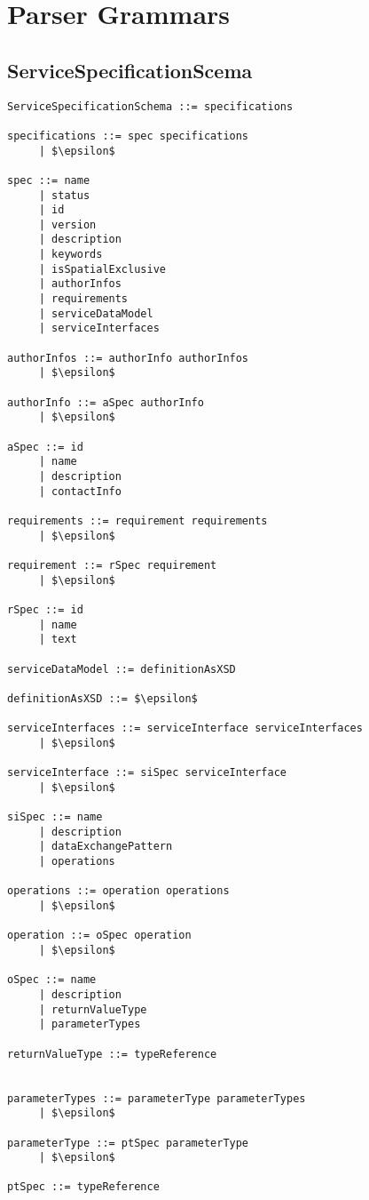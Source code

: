 \section{Parser Grammars}

\subsection{ServiceSpecificationScema}
\begin{lstlisting}[mathescape=true, keywordstyle={}]
ServiceSpecificationSchema ::= specifications

specifications ::= spec specifications
     | $\epsilon$
     
spec ::= name
     | status
     | id
     | version
     | description
     | keywords
     | isSpatialExclusive
     | authorInfos
     | requirements
     | serviceDataModel
     | serviceInterfaces
     
authorInfos ::= authorInfo authorInfos
     | $\epsilon$

authorInfo ::= aSpec authorInfo
     | $\epsilon$

aSpec ::= id
     | name
     | description
     | contactInfo

requirements ::= requirement requirements
     | $\epsilon$

requirement ::= rSpec requirement
     | $\epsilon$

rSpec ::= id
     | name
     | text

serviceDataModel ::= definitionAsXSD

definitionAsXSD ::= $\epsilon$

serviceInterfaces ::= serviceInterface serviceInterfaces
     | $\epsilon$

serviceInterface ::= siSpec serviceInterface
     | $\epsilon$

siSpec ::= name
     | description
     | dataExchangePattern
     | operations

operations ::= operation operations
     | $\epsilon$

operation ::= oSpec operation
     | $\epsilon$

oSpec ::= name
     | description
     | returnValueType
     | parameterTypes

returnValueType ::= typeReference


parameterTypes ::= parameterType parameterTypes
     | $\epsilon$

parameterType ::= ptSpec parameterType
     | $\epsilon$

ptSpec ::= typeReference
\end{lstlisting}

